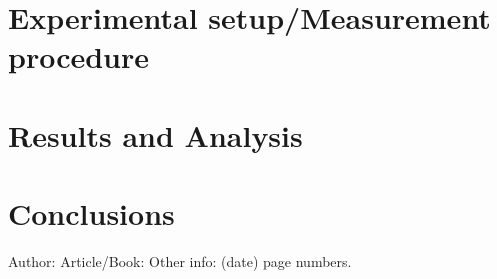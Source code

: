 \documentclass{llncs}
\begin{document}
\begin{comment}
Experimental setup/Measurement procedure: The experimental setup, the
differences of the experimental series, the different parameters used, including local
sensor setup and TARWIS testbed.
\end{comment}
\section{Experimental setup/Measurement procedure}

\begin{comment}
Results and Analysis: Analyze the results which are obtained by local sensors and
on TARWIS testbed. Analyze your data with respect to the aim of the experiment. Your
task during the experiment is not just to measure and document your measurements, but
to derive and present conclusions from your measurements.
\end{comment}

\section{Results and Analysis}

\begin{comment}
Conclusions: Summarize and discuss your results with respect to the literature or
your own scientific expectations. You should in particular discuss possible error sources
and give a short judgment on the quality of the experimental setup (because you also
learn to design the measurement setups). If needed, suggest how to improve the setups.
\end{comment}

\section{Conclusions}




%
%

\begin{thebibliography}{1}
Author:
Article/Book:
Other info: (date) page numbers.
\end{thebibliography}
\end{document}
